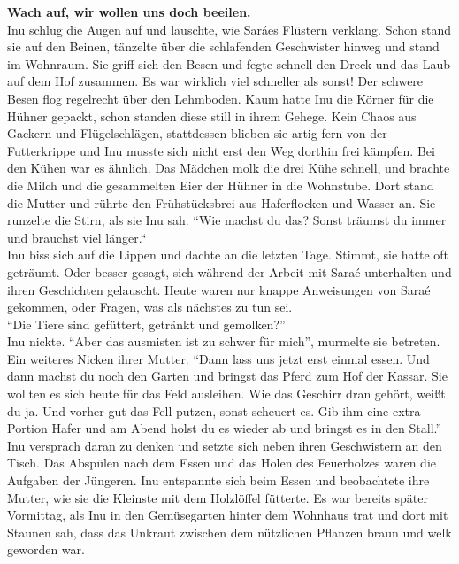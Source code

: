 \documentclass[a4paper,12pt]{book}
\begin{document}
\textbf{Wach auf, wir wollen uns doch beeilen.} \\
Inu schlug die Augen auf und lauschte, wie Saráes Flüstern verklang. Schon stand sie auf den 
Beinen, tänzelte über die schlafenden Geschwister hinweg und stand im Wohnraum. Sie griff sich den 
Besen und fegte schnell den Dreck und das Laub auf dem Hof zusammen. Es war wirklich viel schneller 
als sonst! Der schwere Besen flog regelrecht über den Lehmboden. Kaum hatte Inu die Körner für die 
Hühner gepackt, schon standen diese still in ihrem Gehege. Kein Chaos aus Gackern und 
Flügelschlägen, stattdessen blieben sie artig fern von der Futterkrippe und Inu musste sich nicht 
erst den Weg dorthin frei kämpfen. Bei den Kühen war es ähnlich. Das Mädchen molk die drei Kühe 
schnell, und brachte die Milch und die gesammelten Eier der Hühner in die Wohnstube. Dort stand die 
Mutter und rührte den Frühstücksbrei aus Haferflocken und Wasser an. Sie runzelte die Stirn, als 
sie Inu sah. 
``Wie machst du das? Sonst träumst du immer und brauchst viel länger.``\\
Inu biss sich auf die Lippen und dachte an die letzten Tage. Stimmt, sie hatte oft geträumt. Oder 
besser gesagt, sich während der Arbeit mit Saraé unterhalten und ihren Geschichten gelauscht. Heute 
waren nur knappe Anweisungen von Saraé gekommen, oder Fragen, was als nächstes zu tun sei.\\
``Die Tiere sind gefüttert, getränkt und gemolken?''\\
Inu nickte. ``Aber das ausmisten ist zu schwer für mich'', murmelte sie betreten. \\
Ein weiteres Nicken ihrer Mutter. ``Dann lass uns jetzt erst einmal essen. Und dann machst du noch 
den Garten und bringst das Pferd zum Hof der Kassar. Sie wollten es sich heute für das Feld 
ausleihen. Wie das Geschirr dran gehört, weißt du ja. Und vorher gut das Fell putzen, sonst 
scheuert es. Gib ihm eine extra Portion Hafer und am Abend holst du es wieder ab und bringst es in 
den Stall.''\\
Inu versprach daran zu denken und setzte sich neben ihren Geschwistern an den Tisch. Das Abspülen 
nach dem Essen und das Holen des Feuerholzes waren die Aufgaben der Jüngeren. Inu entspannte sich 
beim Essen und beobachtete ihre Mutter, wie sie die Kleinste mit dem Holzlöffel fütterte. 
Es war bereits später Vormittag, als Inu in den Gemüsegarten hinter dem Wohnhaus trat und dort mit 
Staunen sah, dass das Unkraut zwischen dem nützlichen Pflanzen braun und welk geworden war. \\
\end{document}
